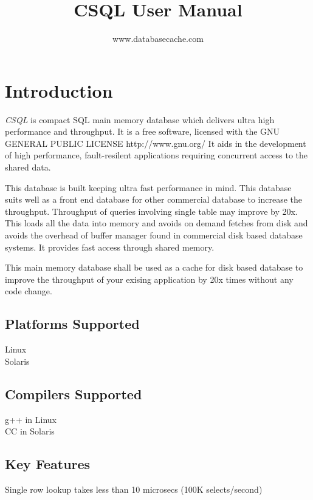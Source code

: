 \documentclass[12pt]{article}
\begin{document}
         

\title{CSQL User Manual } 
\author{www.databasecache.com} 
\date{} 
\maketitle 

\tableofcontents
\pagebreak

\section{Introduction}
\label{Introduction}

\emph {CSQL} is compact SQL main memory database which delivers ultra high performance and throughput. It is a free software, licensed with the GNU GENERAL PUBLIC LICENSE http://www.gnu.org/
It aids in the development of high performance, fault-resilent applications requiring concurrent access to the shared data. 

This database is built keeping ultra fast performance in mind. This database suits well as a front end database for other commercial database to increase the throughput. Throughput of queries involving single table may improve by 20x. This loads all the data into memory and avoids on demand fetches from disk and avoids the overhead of buffer manager found in commercial disk based database systems. It provides fast access through shared memory.

This main memory database shall be used as a cache for disk based database to improve the throughput of your exising application by 20x times without any code change. 
\subsection{Platforms Supported}
\label{psupported}
Linux \\
Solaris 

\subsection{Compilers Supported}
\label{csupported}
g++ in Linux \\
CC in Solaris

\subsection{Key Features}
\label{keyfeatures}
Single row lookup takes less than 10 microsecs (100K selects/second)
\end{document}
